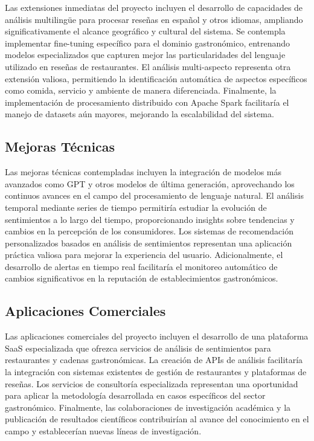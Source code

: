 \documentclass[12pt,a4paper,twoside,openany]{book}
\begin{document}
Las extensiones inmediatas del proyecto incluyen el desarrollo de capacidades de análisis multilingüe para procesar reseñas en español y otros idiomas, ampliando significativamente el alcance geográfico y cultural del sistema. Se contempla implementar fine-tuning específico para el dominio gastronómico, entrenando modelos especializados que capturen mejor las particularidades del lenguaje utilizado en reseñas de restaurantes. El análisis multi-aspecto representa otra extensión valiosa, permitiendo la identificación automática de aspectos específicos como comida, servicio y ambiente de manera diferenciada. Finalmente, la implementación de procesamiento distribuido con Apache Spark facilitaría el manejo de datasets aún mayores, mejorando la escalabilidad del sistema.

\subsection{Mejoras Técnicas}

Las mejoras técnicas contempladas incluyen la integración de modelos más avanzados como GPT y otros modelos de última generación, aprovechando los continuos avances en el campo del procesamiento de lenguaje natural. El análisis temporal mediante series de tiempo permitiría estudiar la evolución de sentimientos a lo largo del tiempo, proporcionando insights sobre tendencias y cambios en la percepción de los consumidores. Los sistemas de recomendación personalizados basados en análisis de sentimientos representan una aplicación práctica valiosa para mejorar la experiencia del usuario. Adicionalmente, el desarrollo de alertas en tiempo real facilitaría el monitoreo automático de cambios significativos en la reputación de establecimientos gastronómicos.

\subsection{Aplicaciones Comerciales}

Las aplicaciones comerciales del proyecto incluyen el desarrollo de una plataforma SaaS especializada que ofrezca servicios de análisis de sentimientos para restaurantes y cadenas gastronómicas. La creación de APIs de análisis facilitaría la integración con sistemas existentes de gestión de restaurantes y plataformas de reseñas. Los servicios de consultoría especializada representan una oportunidad para aplicar la metodología desarrollada en casos específicos del sector gastronómico. Finalmente, las colaboraciones de investigación académica y la publicación de resultados científicos contribuirían al avance del conocimiento en el campo y establecerían nuevas líneas de investigación.
\end{document}
